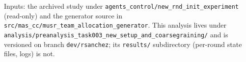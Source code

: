 \documentclass[11pt,a4paper]{article}
\begin{document}
\noindent
Inputs: the archived study under
\texttt{agents\_control/new\_rnd\_init\_experiment} (read-only) and the generator
source in \texttt{src/mas\_cc/musr\_team\_allocation\_generator}. This analysis lives under
\texttt{analysis/preanalysis\_task003\_new\_setup\_and\_coarsegraining/} and is versioned on
branch \texttt{dev/rsanchez}; its \texttt{results/} subdirectory (per-round state
files, logs) is not.
\end{document}
